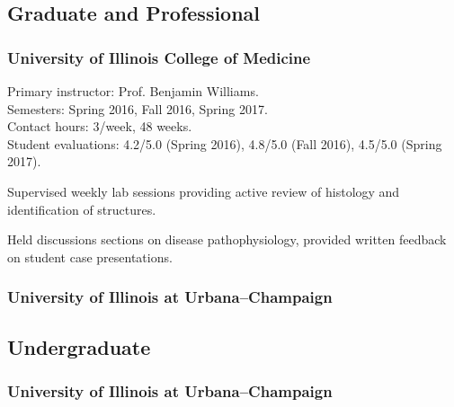 \documentclass[%
]{komacv}
\begin{document}

\begin{longcv}

\subsection{Graduate and Professional}

\subsubsection{University of Illinois College of Medicine}

{Primary instructor: Prof. Benjamin Williams.\\
Semesters: Spring 2016, Fall 2016, Spring 2017.\\
Contact hours: 3/week, 48 weeks.\\
Student evaluations: 4.2/5.0 (Spring 2016), 4.8/5.0 (Fall 2016), 4.5/5.0 (Spring 2017).
\begin{compactitem}
\item Supervised weekly lab sessions providing active review of histology and identification of structures.
\item Held discussions sections on disease pathophysiology, provided written feedback on student case presentations.
\end{compactitem}}

\subsubsection{University of Illinois at Urbana--Champaign}


\subsection{Undergraduate}

\subsubsection{University of Illinois at Urbana--Champaign}


\end{longcv}
\end{document}
